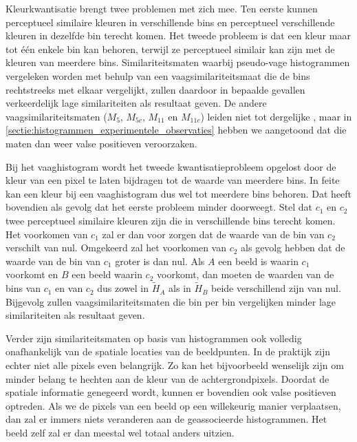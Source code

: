 Kleurkwantisatie brengt twee problemen met zich mee. Ten eerste kunnen 
perceptueel similaire kleuren in verschillende bins en perceptueel 
verschillende kleuren in dezelfde bin terecht komen. Het tweede probleem is dat 
een kleur maar tot \'e\'en enkele bin kan behoren, terwijl ze perceptueel 
similair kan zijn met de kleuren van meerdere bins. Similariteitsmaten waarbij 
pseudo-vage histogrammen vergeleken worden met behulp van een 
vaagsimilariteitsmaat die de bins rechtstreeks met elkaar vergelijkt, zullen 
daardoor in bepaalde gevallen verkeerdelijk lage similariteiten als resultaat 
geven. De andere vaagsimilariteitsmaten ($M_5$, $M_{5c}$, $M_{11}$ en 
$M_{11c}$) leiden niet tot dergelijke , maar in 
\ref{sectie:histogrammen_experimentele_observaties} hebben we aangetoond dat 
die maten dan weer valse positieven veroorzaken.

Bij het vaaghistogram wordt het tweede kwantisatieprobleem opgelost
door de kleur van een pixel te laten bijdragen tot de waarde van meerdere bins. In feite kan een kleur
bij een vaaghistogram dus wel tot meerdere bins behoren. Dat heeft
bovendien als gevolg dat het eerste probleem minder doorweegt. Stel dat $c_1$ en $c_2$ twee perceptueel
similaire kleuren zijn die in verschillende bins terecht komen. Het
voorkomen van $c_1$ zal er dan voor zorgen dat de waarde van de bin van $c_2$ verschilt van nul.
Omgekeerd zal het voorkomen van $c_2$ als gevolg hebben dat de waarde van de bin van $c_1$ groter is
dan nul. Als $A$ een beeld is waarin $c_1$ voorkomt en $B$ een beeld waarin $c_2$ voorkomt, dan
moeten de waarden van de bins van $c_1$ en van $c_2$ dus zowel in $\widetilde{H}_A$ als in 
$\widetilde{H}_B$ beide verschillend zijn van nul. Bijgevolg zullen vaagsimilariteitsmaten
die bin per bin vergelijken minder lage similariteiten als resultaat geven.

Verder zijn similariteitsmaten op basis van histogrammen ook volledig onafhankelijk van de 
spatiale locaties van de beeldpunten. In
de praktijk zijn echter niet alle pixels even belangrijk. Zo kan het
bijvoorbeeld wenselijk zijn om minder belang te hechten aan de kleur van
de achtergrondpixels. Doordat de spatiale informatie genegeerd wordt,
kunnen er bovendien ook valse positieven optreden. Als we de pixels van een
beeld op een willekeurig manier verplaatsen, dan zal er immers niets veranderen aan
de geassocieerde histogrammen. Het beeld zelf zal er dan meestal wel totaal anders uitzien.  

